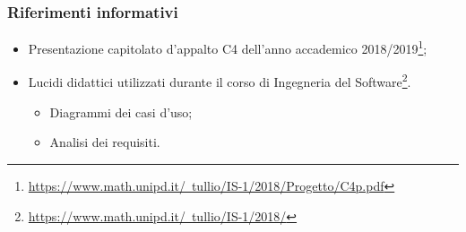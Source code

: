 \subsubsection{Riferimenti informativi}
\begin{itemize}
	\item Presentazione capitolato d’appalto C4 dell'anno accademico 2018/2019\footnote{\href{https://www.math.unipd.it/~tullio/IS-1/2018/Progetto/C4p.pdf}{https://www.math.unipd.it/~tullio/IS-1/2018/Progetto/C4p.pdf}};
	\item Lucidi didattici utilizzati durante il corso di Ingegneria del Software\footnote{\href{https://www.math.unipd.it/~tullio/IS-1/2018/}{https://www.math.unipd.it/~tullio/IS-1/2018/}}.
	\begin{itemize}
		\item Diagrammi dei casi d’uso;
		\item Analisi dei requisiti.
	\end{itemize}
\end{itemize}
